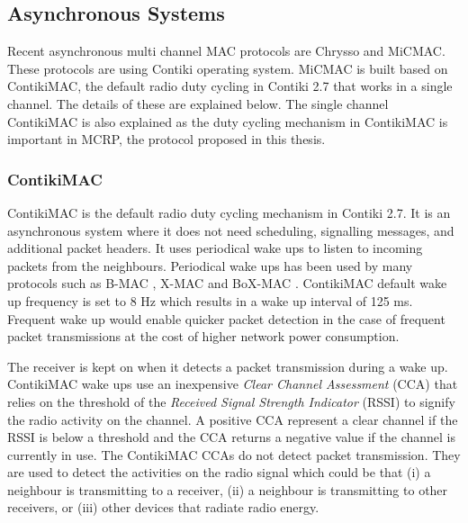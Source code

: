 

\subsection{Asynchronous Systems}
Recent asynchronous multi channel MAC protocols are Chrysso and MiCMAC. These protocols are using Contiki operating system. MiCMAC is built based on ContikiMAC, the default radio duty cycling in Contiki 2.7 that works in a single channel. The details of these are explained below. The single channel ContikiMAC is also explained as the duty cycling mechanism in ContikiMAC is important in MCRP, the protocol proposed in this thesis.

\subsubsection{ContikiMAC}
ContikiMAC \cite{contikimac} is the default radio duty cycling mechanism in Contiki 2.7. It is an asynchronous system where it does not need scheduling, signalling messages, and additional packet headers. It uses periodical wake ups to listen to incoming packets from the neighbours. Periodical wake ups has been used by many protocols such as B-MAC \cite{bmac}, X-MAC \cite{xmac} and BoX-MAC \cite{boxmac}. 
ContikiMAC default wake up frequency is set to 8 Hz which results in a wake up interval of 125 ms. Frequent wake up would enable quicker packet detection in the case of frequent packet transmissions at the cost of higher network power consumption.

The receiver is kept on when it detects a packet transmission during a wake up. ContikiMAC wake ups use an inexpensive \textit{Clear Channel Assessment} (CCA) that relies on the threshold of the \textit{Received Signal Strength Indicator} (RSSI) to signify the radio activity on the channel. A positive CCA represent a clear channel if the RSSI is below a threshold and the CCA returns a negative value if the channel is currently in use. The ContikiMAC CCAs do not detect packet transmission. They are used to detect the activities on the radio signal which could be that (i) a neighbour is transmitting to a receiver, (ii) a neighbour is transmitting to other receivers, or (iii) other devices that radiate radio energy. 


